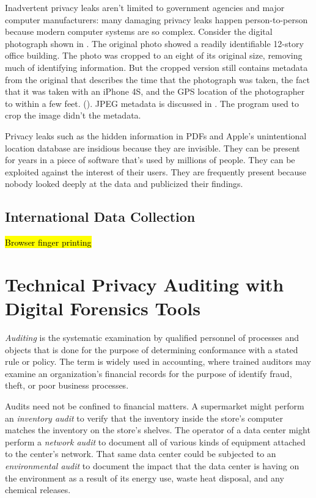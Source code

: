 Inadvertent privacy leaks aren't limited to government agencies and
major computer manufacturers: many damaging privacy leaks happen
person-to-person because modern computer systems are so
complex. Consider the digital photograph shown in . The
original photo showed a readily
identifiable 12-story office building. The photo was cropped to an
eight of its original size, removing much of identifying information. But the cropped
version still contains metadata from the original that
describes the time that the photograph was taken, the fact that it was
taken with an iPhone 4S, and the GPS location of the
photographer to within a few feet. (). JPEG
metadata is discussed in . The program used to crop
the image didn't the metadata.



Privacy leaks such as the hidden information in PDFs and Apple's
unintentional location database are insidious because they are
invisible. They can be present for years in a piece of software that's
used by millions of people. They can be exploited against the interest
of their users. They are frequently present because nobody looked
deeply at the data and publicized their findings. 


\subsection{International Data Collection}
\hl{Browser finger printing}


\section{Technical Privacy Auditing with Digital Forensics Tools \INDEV}

\emph{Auditing} is the systematic examination by qualified personnel of processes and
objects that is done for the purpose of determining conformance with a
stated rule or policy. 
The term is widely used in accounting, where
trained auditors may examine an organization's financial records for
the purpose of identify fraud, theft, or poor business processes. 

Audits need not be confined to financial matters.  A supermarket might
perform an \emph{inventory audit} to verify that the inventory inside
the store's computer matches the inventory on the store's shelves. The
operator of a data center might perform a \emph{network audit} to document all of
various kinds of equipment attached to the center's network. That same
data center could be subjected to an \emph{environmental audit} to
document the impact that the data center is having on the environment
as a result of its energy use, waste heat disposal, and any chemical
releases. 

